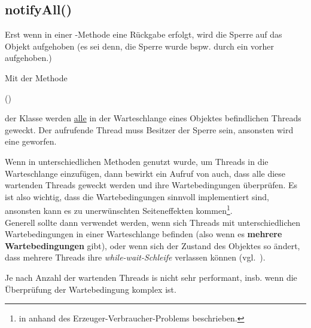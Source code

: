 \subsection{notifyAll()}

Erst wenn in einer -Methode eine Rückgabe erfolgt, wird die Sperre auf das Objekt aufgehoben (es sei denn, die Sperre wurde bspw. durch ein  vorher aufgehoben.)

\noindent
Mit der Methode

\begin{center}
     ()
\end{center}

\noindent
der Klasse  werden \ul{alle} in der Warteschlange eines Objektes befindlichen Threads geweckt.
\noindent
Der aufrufende Thread muss Besitzer der Sperre sein, ansonsten wird eine  geworfen.

\begin{tcolorbox}[enlarge top by=0.5cm,enlarge bottom by=0.5cm]
Wenn in unterschiedlichen Methoden  genutzt wurde, um Threads in die Warteschlange einzufügen, dann bewirkt ein Aufruf von  auch, dass alle diese wartenden Threads geweckt werden und ihre Wartebedingungen überprüfen.
Es ist also wichtig, dass die Wartebedingungen sinnvoll implementiert sind, ansonsten kann es zu unerwünschten Seiteneffekten kommen\footnote {
    in \cite[71 ff.]{Oec22} anhand des Erzeuger-Verbraucher-Problems beschrieben.
}.\\
Generell sollte  dann verwendet werden, wenn sich Threads mit unterschiedlichen Wartebedingungen in einer Warteschlange befinden (also wenn es \textbf{mehrere Wartebedingungen} gibt), oder wenn sich der Zustand des Objektes so ändert, dass mehrere Threads ihre \textit{while-wait-Schleife} verlassen können (vgl.~\cite[73]{Oec22}).
\end{tcolorbox}


\noindent
Je nach Anzahl der wartenden Threads is  nicht sehr performant, insb. wenn die Überprüfung der Wartebedingung komplex ist.

